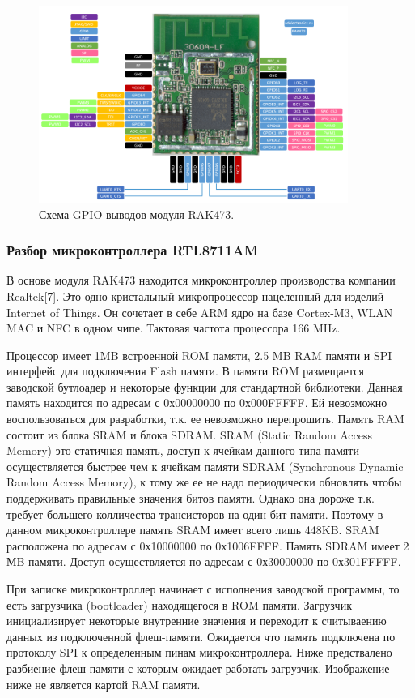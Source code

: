 \begin{figure}[h!]
    \centering
    \includegraphics[width=0.9\textwidth]{rak473_pinout.png}
    \caption{Схема GPIO выводов модуля RAK473.}
\end{figure}

\subsubsection{ Разбор микроконтроллера RTL8711AM }
В основе модуля RAK473 находится микроконтроллер производства компании Realtek[7]. Это одно-кристальный микропроцессор нацеленный для изделий Internet of Things. Он сочетает в себе ARM ядро на базе Cortex-M3, WLAN MAC и NFC в одном чипе. Тактовая частота процессора 166 MHz. 

Процессор имеет 1MB встроенной ROM памяти, 2.5 MB RAM памяти и SPI интерфейс для подключения Flash памяти.  В памяти ROM размещается заводской бутлоадер и некоторые функции для стандартной библиотеки. Данная память находится по адресам с 0х00000000 по 0х000FFFFF. Ей невозможно воспользоваться для разработки, т.к. ее невозможно перепрошить. Память RAM состоит из блока SRAM и блока SDRAM. SRAM (Static Random Access Memory) это статичная память, доступ к ячейкам данного типа памяти осуществляется быстрее чем к ячейкам памяти SDRAM (Synchronous Dynamic Random Access Memory), к тому же ее не надо периодически обновлять чтобы поддерживать правильные значения битов памяти. Однако она дороже т.к. требует большего колличества трансисторов на один бит памяти. Поэтому в данном микроконтроллере память SRAM имеет всего лишь 448KB. SRAM расположена по адресам с 0х10000000 по 0х1006FFFF. Память SDRAM имеет 2 МB памяти. Доступ осуществляется по адресам с 0х30000000 по 0х301FFFFF.

При записке микроконтроллер начинает с исполнения заводской программы, то есть загрузчика (bootloader) находящегося в ROM памяти. Загрузчик инициализирует некоторые внутренние значения и переходит к считываению данных из подключенной флеш-памяти. Ожидается что память подключена по протоколу SPI к определенным пинам микроконтроллера. 
Ниже предствалено разбиение флеш-памяти с которым ожидает работать загрузчик. Изображение ниже не является картой RAM памяти. 

